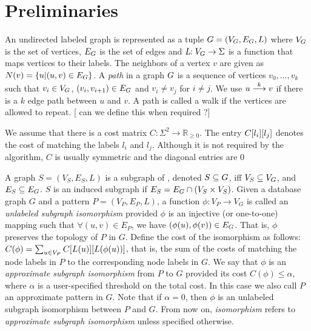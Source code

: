 \section{Preliminaries}

An undirected labeled graph \db is represented as a tuple $ \db =
(\vg,\eg,L) $ where $\vg$ is the set of vertices, $\eg$ is the set of
edges and $L\!\!: \vg \rightarrow \Sigma $ is a function that maps
vertices to their labels.  The neighbors of a vertex $v$ are given as $
N(v) = \{ u | (u,v) \in \eg \} $.  A
{\em path} in a graph $\db$ is a sequence of vertices $v_0,\ldots,v_k$
such that $v_i \in \vg$, $(v_i,v_{i+1}) \in \eg$ and $v_i \neq v_j$ for
$i \neq j$.
We use $\kpath{u}{v}{k}$ if there is a $k$ edge path
between $u$ and $v$.
A path is called a walk if the vertices
are allowed to repeat. [ can we define this when required ?]

\smallskip{}
We assume that there is a cost matrix 
$C\!\!:\Sigma^{2} \rightarrow \mathbb{R}_{\geq 0} $. 
The entry $\matij{C}{l_i}{l_j}$
denotes the cost of matching the labels $l_i$ and $l_j$. Although it is 
not required by the algorithm, $C$ is usually symmetric and the diagonal
entries are $0$

\smallskip{}
A graph $S = (V_S,E_S,L)$ is a subgraph of \db, denoted $S \subseteq
\db$, iff $V_S \subseteq \vg$, and $E_S \subseteq \eg$.  $S$ is an
induced subgraph if $E_S = \eg \cap (V_S \times V_S)$.  Given a database
graph $G$ and a pattern $P = (V_P,E_P,L)$, a function $\phi\!\!: V_P \to
V_G$ is called an {\em unlabeled subgraph isomorphism} provided $\phi$
is an injective (or one-to-one) mapping such that $\forall (u,v) \in
E_P$, we have $(\phi(u),\phi(v)) \in \eg$. That is, $\phi$ preserves the
topology of $P$ in $G$. Define the cost of the isomorphism as follows:
$C(\phi) = \sum_{u \in \vp} \matij{C}{L(u)}{L(\phi(u))}$, that is, the
sum of the costs of matching the node labels in $P$ to the corresponding
node labels in $G$.  We say that $\phi$ is an {\em approximate subgraph
isomorphism} from $P$ to $G$ provided its cost $C(\phi) \le \alpha$,
where $\alpha$ is a user-specified threshold on the total cost. In this
case we also call $P$ an approximate pattern in $G$. Note
that if $\alpha = 0$, then $\phi$ is an unlabeled subgraph isomorphism
between $P$ and $G$. From now on, \textit{isomorphism}
refers to \textit{approximate subgraph isomorphism} unless specified
otherwise.


